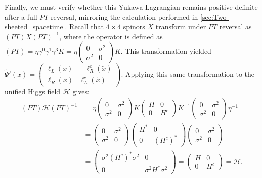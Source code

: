 Finally, we must verify whether this Yukawa Lagrangian remains positive-definite after a full $PT$ reversal, mirroring the calculation performed in \cref{sec:Two-sheeted_spacetime}.
Recall that $4\times 4$ spinors $X$ transform under $PT$ reversal as $(PT)X(PT)^{-1}$, where the operator is defined as $(PT)=\eta \gamma^0\gamma^1\gamma^3K=\eta\begin{pmatrix}0&\sigma^2\\ \sigma^2&0\end{pmatrix}K$. This transformation yielded $ \tilde \Psi'(x)=\begin{pmatrix}\ell_L(x)&-\ell_R^c(\tilde x)\\ \ell_R(x) & \ell_L^c(\tilde x)\end{pmatrix}$. Applying this same transformation to the unified Higgs field $\mathcal{H}$ gives: 
\begin{equation}
\begin{aligned}
    (PT)\mathcal{H}(PT)^{-1}&=\eta\begin{pmatrix}0&\sigma^2\\ \sigma^2&0\end{pmatrix}K \begin{pmatrix} H & 0 \\ 0 & H^{c} \end{pmatrix}K^{-1}\begin{pmatrix}0&\sigma^2\\ \sigma^2&0\end{pmatrix}\eta^{-1}\\
    &=\begin{pmatrix}0&\sigma^2\\ \sigma^2&0\end{pmatrix}\begin{pmatrix} H^* & 0 \\ 0 & (H^{c})^* \end{pmatrix}\begin{pmatrix}0&\sigma^2\\ \sigma^2&0\end{pmatrix}\\
    &=\begin{pmatrix}\sigma^2(H^{c})^*\sigma^2  & 0 \\ 0 & \sigma^2H^*\sigma^2 \end{pmatrix}=\begin{pmatrix} H & 0 \\ 0 & H^{c} \end{pmatrix}=\mathcal{H}.
\end{aligned}
\end{equation}

